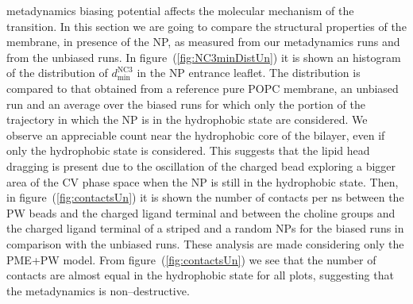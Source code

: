 metadynamics biasing potential affects the molecular mechanism of the transition. In this section we are going to 
compare the structural properties of the membrane, in presence of the \ac{NP}, as measured from our metadynamics 
runs and from the unbiased runs. In figure~(\ref{fig:NC3minDistUn}) it is shown an histogram of the distribution 
of $d_\text{min}^{\text{NC}3}$ in the \ac{NP} entrance leaflet. The distribution is compared to that obtained from 
a reference pure \ac{POPC} membrane, an unbiased run and an average over the biased runs for which only the 
portion of the trajectory in which the \ac{NP} is in the hydrophobic state are considered. We observe an 
appreciable count near the hydrophobic core of the bilayer, even if only the hydrophobic state is considered. This 
suggests that the lipid head dragging is present due to the oscillation of the charged bead exploring a bigger 
area of the \ac{CV} phase space when the \ac{NP} is still in the hydrophobic state. Then, in 
figure~(\ref{fig:contactsUn}) it is shown the number of contacts per ns between the \ac{PW} beads and the charged 
ligand terminal and between the choline groups and the charged ligand terminal of a striped and a random \acp{NP} 
for the biased runs in comparison with the unbiased runs. These analysis are made considering only the 
\ac{PME}+\ac{PW} model. From figure~(\ref{fig:contactsUn}) we see that the number of contacts are almost equal in 
the hydrophobic state for all plots, suggesting that the metadynamics is non--destructive.
